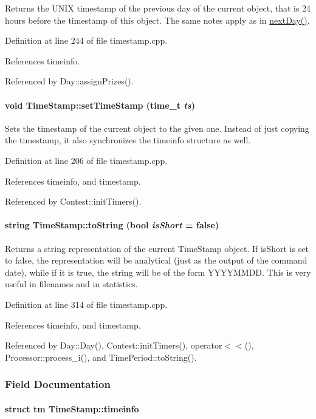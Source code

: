 Returns the UNIX timestamp of the previous day of the current object, that is 24 hours before the timestamp of this object. The same notes apply as in \hyperlink{classTimeStamp_TimeStampa16}{next\-Day()}. 

Definition at line 244 of file timestamp.cpp.

References timeinfo.

Referenced by Day::assign\-Prizes().\hypertarget{classTimeStamp_TimeStampa15}{
\paragraph[setTimeStamp]{\setlength{\rightskip}{0pt plus 5cm}void Time\-Stamp::set\-Time\-Stamp (time\_\-t {\em ts})}\hfill}
\label{classTimeStamp_TimeStampa15}


Sets the timestamp of the current object to the given one. Instead of just copying the timestamp, it also synchronizes the timeinfo structure as well. 

Definition at line 206 of file timestamp.cpp.

References timeinfo, and timestamp.

Referenced by Contest::init\-Timers().\hypertarget{classTimeStamp_TimeStampa20}{
\paragraph[toString]{\setlength{\rightskip}{0pt plus 5cm}string Time\-Stamp::to\-String (bool {\em is\-Short} = false)}\hfill}
\label{classTimeStamp_TimeStampa20}


Returns a string representation of the current Time\-Stamp object. If is\-Short is set to false, the representation will be analytical (just as the output of the command date), while if it is true, the string will be of the form YYYYMMDD. This is very useful in filenames and in statistics. 

Definition at line 314 of file timestamp.cpp.

References timeinfo, and timestamp.

Referenced by Day::Day(), Contest::init\-Timers(), operator$<$$<$(), Processor::process\_\-i(), and Time\-Period::to\-String().

\subsubsection{Field Documentation}
\hypertarget{classTimeStamp_TimeStampo0}{
\paragraph[timeinfo]{\setlength{\rightskip}{0pt plus 5cm}struct tm Time\-Stamp::timeinfo}\hfill}
\label{classTimeStamp_TimeStampo0}




